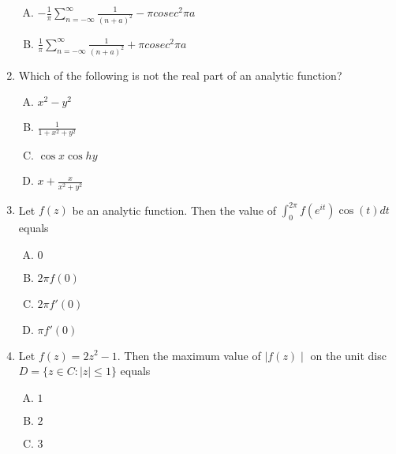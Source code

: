 \documentclass[12pt,a4paper]{article}
\begin{document}
\begin{enumerate}
\begin{enumerate}[(A)]
\item $
-\frac{1}{\pi} \sum\limits_{n= -\infty}^{\infty} \frac{1}{(n+a)^2} - \pi cosec^2 \pi a
$


\item $
\frac{1}{\pi} \sum\limits_{n= -\infty}^{\infty} \frac{1}{(n+a)^2} + \pi cosec^2 \pi a
$

\end{enumerate}

\item Which of the following is not the real part of an analytic function?

\begin{enumerate}[(A)]

\item $
x^2-y^2
$

\item $
\frac{1}{1+x^2+y^2}
$

\item $
\cos x \cos h y
$

\item $
x+ \frac{x}{x^2+y^2}
$

\end{enumerate}

\item Let $f(z)$ be an analytic function. Then the value of $\int_{0}^{2 \pi} f(e^{it}) \cos (t) dt $ equals

\begin{enumerate}[(A)]

\item $
0
$

\item $
2 \pi f(0) 
$

\item $
2 \pi f'(0) 
$

\item $
\pi f'(0)
$

\end{enumerate}

\item Let $f(z)=2z^2-1$. Then the maximum value of $ \mid f(z) \mid $ on the unit disc 
$ D= \lbrace z \in C : \mid z \mid \leq 1 \rbrace $ equals 


\begin{enumerate}[(A)]

\item $
1
$

\item $
2
$

\item $
3
$


\end{enumerate}
\end{enumerate}
\end{document}

